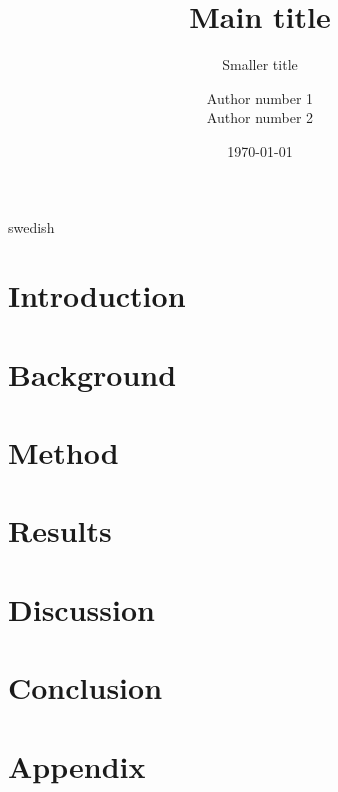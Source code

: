\documentclass[a4paper,12pt]{kth-mag}
\title{Main title}
\subtitle{Smaller title}
\author{Author number 1\\Author number 2} %
\date{\today}
\begin{document}
\frontmatter
\pagestyle{empty}
\removepagenumbers
\maketitle
{}

\begin{abstract}
\end{abstract}

\begin{foreignabstract}{swedish}
\end{foreignabstract}
\newpage

\tableofcontents*
\mainmatter
\pagestyle{newchap}

\chapter{Introduction}


\chapter{Background}


\chapter{Method}


\chapter{Results}


\chapter{Discussion}


\chapter{Conclusion}


\newpage


\appendix
\chapter{Appendix}
\end{document}
